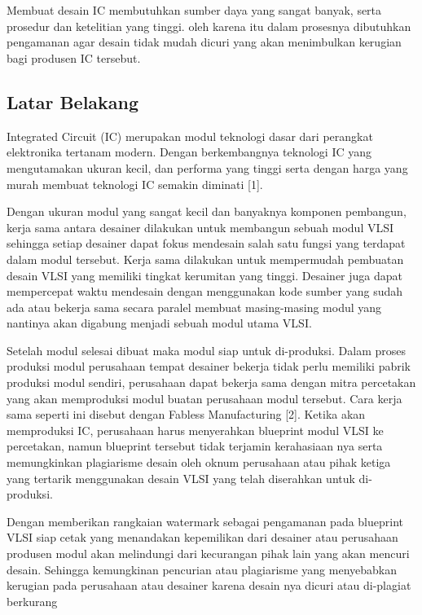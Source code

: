 \chapter{\babSatu}
Membuat desain IC membutuhkan sumber daya yang sangat banyak, serta prosedur dan ketelitian yang tinggi. oleh karena itu dalam prosesnya dibutuhkan pengamanan agar desain tidak mudah dicuri yang akan menimbulkan kerugian bagi produsen IC tersebut.

\section{Latar Belakang}
Integrated Circuit (IC) merupakan modul teknologi dasar dari perangkat elektronika tertanam modern. Dengan berkembangnya teknologi IC yang mengutamakan ukuran kecil, dan performa yang tinggi serta dengan harga yang murah membuat teknologi IC semakin diminati [1].

Dengan ukuran modul yang sangat kecil dan banyaknya komponen pembangun, kerja sama antara desainer dilakukan untuk membangun sebuah modul VLSI sehingga setiap desainer dapat fokus mendesain salah satu fungsi yang terdapat dalam modul tersebut. Kerja sama dilakukan untuk mempermudah pembuatan desain VLSI yang memiliki tingkat kerumitan yang tinggi. Desainer juga dapat mempercepat waktu mendesain dengan menggunakan kode sumber yang sudah ada atau bekerja sama secara paralel membuat masing-masing modul yang nantinya akan digabung menjadi sebuah modul utama VLSI.

Setelah modul selesai dibuat maka modul siap untuk di-produksi. Dalam proses produksi modul perusahaan tempat desainer bekerja tidak perlu memiliki pabrik produksi modul sendiri, perusahaan dapat bekerja sama dengan mitra percetakan yang akan memproduksi modul buatan perusahaan modul tersebut. Cara kerja sama seperti ini disebut dengan Fabless Manufacturing [2]. Ketika akan memproduksi IC, perusahaan harus menyerahkan blueprint modul VLSI ke percetakan, namun blueprint tersebut tidak terjamin kerahasiaan nya serta memungkinkan plagiarisme desain oleh oknum perusahaan atau pihak ketiga yang tertarik menggunakan desain VLSI yang telah diserahkan untuk di-produksi.

Dengan memberikan rangkaian watermark sebagai pengamanan pada blueprint VLSI siap cetak yang menandakan kepemilikan dari desainer atau perusahaan produsen modul akan melindungi dari kecurangan pihak lain yang akan mencuri desain. Sehingga kemungkinan pencurian atau plagiarisme yang menyebabkan kerugian pada perusahaan atau desainer karena desain nya dicuri atau di-plagiat berkurang

